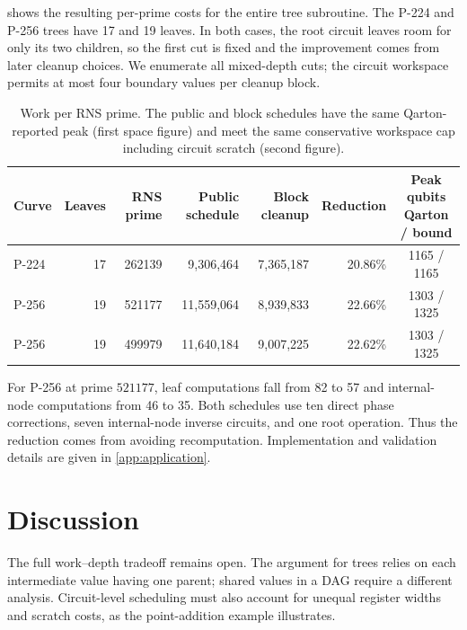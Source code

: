 \documentclass[11pt]{article}
\theoremstyle{definition}
\theoremstyle{remark}
\begin{document}
 shows the resulting per-prime costs for the entire tree subroutine. The P-224 and P-256 trees have 17 and 19 leaves. In both cases, the root circuit leaves room for only its two children, so the first cut is fixed and the improvement comes from later cleanup choices. We enumerate all mixed-depth cuts; the circuit workspace permits at most four boundary values per cleanup block.

\begin{table}[H]
\centering
\small
\setlength{\tabcolsep}{3.2pt}
\renewcommand{\arraystretch}{1.15}
\begin{tabular}{@{}lrrrrrc@{}}
\toprule
Curve & Leaves & RNS prime & Public schedule & Block cleanup & Reduction & \shortstack{Peak qubits\\Qarton / bound} \\
\midrule
P-224 & 17 & 262139 & 9,306,464 & 7,365,187 & 20.86\% & 1165 / 1165 \\
P-256 & 19 & 521177 & 11,559,064 & 8,939,833 & 22.66\% & 1303 / 1325 \\
P-256 & 19 & 499979 & 11,640,184 & 9,007,225 & 22.62\% & 1303 / 1325 \\
\bottomrule
\end{tabular}
\caption{Work per RNS prime. The public and block schedules have the same Qarton-reported peak (first space figure) and meet the same conservative workspace cap including circuit scratch (second figure).}
\label{tab:cfs-application}
\end{table}

For P-256 at prime $521177$, leaf computations fall from 82 to 57 and internal-node computations from 46 to 35. Both schedules use ten direct phase corrections, seven internal-node inverse circuits, and one root operation. Thus the reduction comes from avoiding recomputation. Implementation and validation details are given in \cref{app:application}.

\section{Discussion}

The full work--depth tradeoff remains open. The argument for trees relies on each intermediate value having one parent; shared values in a DAG require a different analysis. Circuit-level scheduling must also account for unequal register widths and scratch costs, as the point-addition example illustrates.

\appendix
\end{document}
